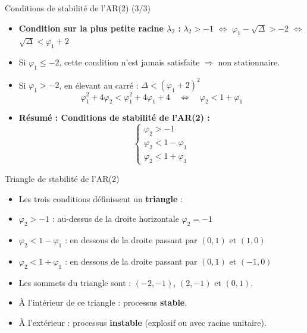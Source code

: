 \documentclass[11pt,aspectratio=169]{beamer}
\begin{document}
\begin{frame}{Conditions de stabilité de l'AR(2) (3/3)}

\begin{itemize}

\item \textbf{Condition sur la plus petite racine $\lambda_2$ :}
$\lambda_2 > -1$ $\Leftrightarrow$ $\varphi_1 - \sqrt{\Delta} > -2$ $\Leftrightarrow$ $\sqrt{\Delta} < \varphi_1 + 2$\newline

\item Si $\varphi_1 \leq -2$, cette condition n'est jamais satisfaite $\Rightarrow$ non stationnaire.\newline

\item Si $\varphi_1 > -2$, en élevant au carré : $\Delta < (\varphi_1 + 2)^2$
\[
\varphi_1^2 + 4\varphi_2 < \varphi_1^2 + 4\varphi_1 + 4 \quad \Leftrightarrow \quad \boxed{\varphi_2 < 1 + \varphi_1}
\]

\item \textbf{Résumé : Conditions de stabilité de l'AR(2) :} \[
\boxed{
\begin{cases}
\varphi_2 > -1 \\
\varphi_2 < 1 - \varphi_1 \\
\varphi_2 < 1 + \varphi_1
\end{cases}
}
\]

\end{itemize}
\end{frame}

\begin{frame}{Triangle de stabilité de l'AR(2)}

\begin{itemize}

\item Les trois conditions définissent un \textbf{triangle} :\newline

\item $\varphi_2 > -1$ : au-dessus de la droite horizontale $\varphi_2 = -1$\newline

\item $\varphi_2 < 1 - \varphi_1$ : en dessous de la droite passant par $(0, 1)$ et $(1, 0)$\newline

\item $\varphi_2 < 1 + \varphi_1$ : en dessous de la droite passant par $(0, 1)$ et $(-1, 0)$\newline

\item Les sommets du triangle sont : $(-2, -1)$, $(2, -1)$ et $(0, 1)$.\newline

\item À l'intérieur de ce triangle : processus \textbf{stable}.\newline

\item À l'extérieur : processus \textbf{instable} (explosif ou avec racine unitaire).

\end{itemize}
\end{frame}
\end{document}
